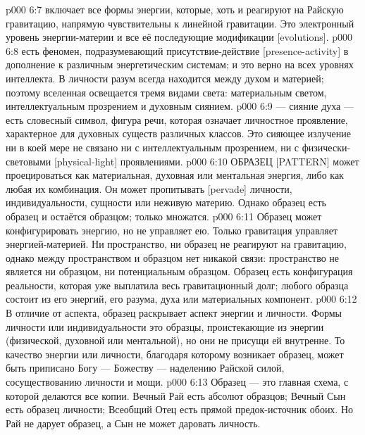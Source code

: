 \vs p000 6:7 \bibnobreakspace {} включает все формы энергии, которые, хоть и реагируют на Райскую гравитацию, напрямую чувствительны к линейной гравитации. Это электронный уровень энергии\hyp{}материи и все её последующие модификации [evolutions].
\vs p000 6:8 \pc {} есть феномен, подразумевающий присутствие\hyp{}действие [presence\hyp{}activity]  в дополнение к различным энергетическим системам; и это верно на всех уровнях интеллекта. В личности разум всегда находится между духом и материей; поэтому вселенная освещается тремя видами света: материальным светом, интеллектуальным прозрением и духовным сиянием.
\vs p000 6:9 \pc {} --- сияние духа --- есть словесный символ, фигура речи, которая означает личностное проявление, характерное для духовных существ различных классов. Это сияющее излучение ни в коей мере не связано ни с интеллектуальным прозрением, ни с физически\hyp{}световыми [physical\hyp{}light] проявлениями.
\vs p000 6:10 \pc ОБРАЗЕЦ [PATTERN] может проецироваться как материальная, духовная или ментальная энергия, либо как любая их комбинация. Он может пропитывать [pervade] личности, индивидуальности, сущности или неживую материю. Однако образец есть образец и остаётся образцом; только  множатся.
\vs p000 6:11 Образец может конфигурировать энергию, но не управляет ею. Только гравитация управляет энергией\hyp{}материей. Ни пространство, ни образец не реагируют на гравитацию, однако между пространством и образцом нет никакой связи: пространство не является ни образцом, ни потенциальным образцом. Образец есть конфигурация реальности, которая уже выплатила весь гравитационный долг;  любого образца состоит из его энергий, его разума, духа или материальных компонент.
\vs p000 6:12 В отличие от  аспекта, образец раскрывает  аспект энергии и личности. Формы личности или индивидуальности это образцы, проистекающие из энергии (физической, духовной или ментальной), но они не присущи ей внутренне. То качество энергии или личности, благодаря которому возникает образец, может быть приписано Богу --- Божеству --- наделению Райской силой, сосуществованию личности и мощи.
\vs p000 6:13 Образец --- это главная схема, с которой делаются все копии. Вечный Рай есть абсолют образцов; Вечный Сын есть образец личности; Всеобщий Отец есть  прямой предок\hyp{}источник обоих. Но Рай не дарует образец, а Сын не может даровать личность.
